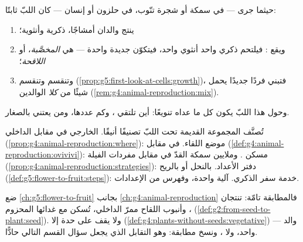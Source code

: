 \begin{proposition}\label{prop:g8:sexual-reproduction:core}
حيثما جرى  --- في سمكة أو شجرة تنّوب، في حلزون أو
إنسان --- كان اللبّ ثابتًا:
\begin{enumerate}
  \item ينتج والدان أمشاجًا، ذكرية وأنثوية؛
  \item ويقع \emph{}: فيلتحم  ذكري واحد  أنثوي
        واحد، فيتكوّن  جديدة واحدة --- هي
        \emph{ المخصَّبة}، أو
        \emph{اللاقحة}؛
  \item وتنقسم  وتنقسم
        (\cref{prop:g5:first-look-at-cells:growth})، فتبني فردًا
        جديدًا يحمل شيئًا من \emph{كلا} الوالدين
        (\cref{rem:g4:animal-reproduction:mix}).
\end{enumerate}
وحول هذا اللبّ يكون كل ما عداه تنويعًا: أين تلتقي ، وكم
عددها، ومن يعتني بالصغار.
\end{proposition}
\admitted

\begin{example}\label{ex:g8:sexual-reproduction:variations}
تُصنَّف المجموعة القديمة تحت اللبّ تصنيفًا أنيقًا.  الخارجي
في مقابل الداخلي
(\cref{prop:g4:animal-reproduction:where}): موضع اللقاء. 
في مقابل  (\cref{def:g4:animal-reproduction:ovivivi}): مسكن
. وملايين سمكة القدّ في مقابل مفردات الفيلة
(\cref{prop:g4:animal-reproduction:strategies}): دفتر الأعداد.
 بالنحل أو بالريح
(\cref{def:g5:flower-to-fruit:steps}): خدمة سفر  الذكري.
آلية واحدة، وفهرس من الإعدادات.
\end{example}

\begin{remark}\label{rem:g8:sexual-reproduction:plants}
ضع \cref{ch:g5:flower-to-fruit} بجانب
\cref{ch:g4:animal-reproduction} فالمطابقة تامّة:  
تنتجان ، وأنبوب اللقاح ممرّ  الداخلي،  تُسكن
  مع غدائها المحزوم
(\cref{def:g2:from-seed-to-plant:seed}). ولا يقف على حدة إلا
 (\cref{def:g4:plants-without-seeds:vegetative}) ---
والد واحد، ولا ، ونسخ مطابقة: وهو التقابل الذي يجعل سؤال
القسم التالي حادًّا.
\end{remark}

